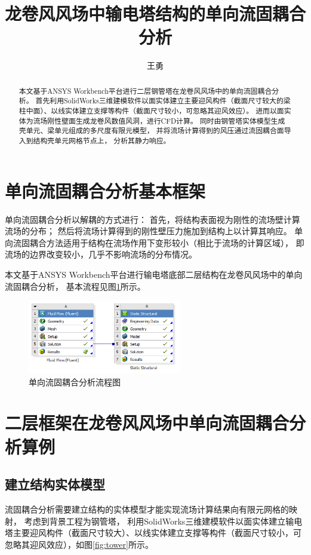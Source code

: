 \documentclass{ctexart}
\title{龙卷风风场中输电塔结构的单向流固耦合分析}
\author{王勇}
\date{}
\begin{document}
\graphicspath{{figures/}}

\maketitle

\begin{abstract}
本文基于ANSYS Workbench平台进行二层钢管塔在龙卷风风场中的单向流固耦合分析。
首先利用SolidWorks三维建模软件以面实体建立主要迎风构件（截面尺寸较大的梁柱中面）、以线实体建立支撑等构件（截面尺寸较小，可忽略其迎风效应）。
进而以面实体为流场刚性壁面生成龙卷风数值风洞，进行CFD计算。
同时由钢管塔实体模型生成壳单元、梁单元组成的多尺度有限元模型，
并将流场计算得到的风压通过流固耦合面导入到结构壳单元网格节点上，
分析其静力响应。
\end{abstract}

\section{单向流固耦合分析基本框架}
单向流固耦合分析以解耦的方式进行\cite{benra2011comparison,qian2008fsi}：
首先，将结构表面视为刚性的流场壁计算流场的分布；
然后将流场计算得到的刚性壁压力施加到结构上以计算其响应。
单向流固耦合方法适用于结构在流场作用下变形较小（相比于流场的计算区域），
即流场的边界改变较小，几乎不影响流场的分布情况。

本文基于ANSYS Workbench平台进行输电塔底部二层结构在龙卷风风场中的单向流固耦合分析\cite{cornell2016fsi1, cornell2016fsi2}，
基本流程见图\ref{fig:fsi-chart}所示。

\begin{figure}[!htpb]\label{fig:fsi-chart}
  \centering
  \includegraphics[width=0.6\textwidth]{fsi-chart.png}
  \caption{单向流固耦合分析流程图}
\end{figure}

\section{二层框架在龙卷风风场中单向流固耦合分析算例}

\subsection{建立结构实体模型}
流固耦合分析需要建立结构的实体模型才能实现流场计算结果向有限元网格的映射，
考虑到背景工程为钢管塔，
利用SolidWorks三维建模软件以面实体建立输电塔主要迎风构件（截面尺寸较大）、以线实体建立支撑等构件（截面尺寸较小，可忽略其迎风效应），如图\ref{fig:tower}所示。
\end{document}
